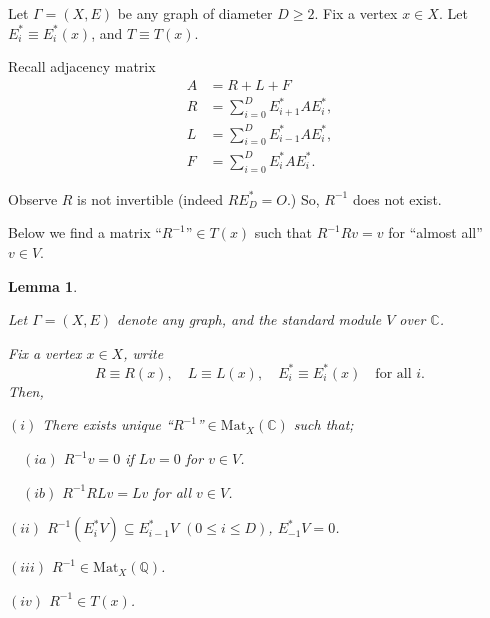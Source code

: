 \documentclass[
]{book}
\newtheorem{lemma}{Lemma}[chapter]
\theoremstyle{definition}
\theoremstyle{definition}
\theoremstyle{definition}
\theoremstyle{definition}
\theoremstyle{remark}
\begin{document}
Let \(\Gamma = (X, E)\) be any graph of diameter \(D\geq 2\). Fix a vertex \(x\in X\). Let \(E^*_i\equiv E^*_i(x)\), and \(T \equiv T(x)\).

Recall adjacency matrix
\begin{align}
A & = R + L + F\\
R & = \sum_{i=0}^D E^*_{i+1}AE^*_i,\\
L & = \sum_{i=0}^D E^*_{i-1}AE^*_i,\\
F & = \sum_{i=0}^D E^*_{i}AE^*_i.
\end{align}

Observe \(R\) is not invertible (indeed \(RE^*_D = O\).)
So, \(R^{-1}\) does not exist.

Below we find a matrix ``\(R^{-1}\)''\(\in T(x)\) such that \(R^{-1}Rv = v\) for ``almost all'' \(v\in V\).

\begin{lemma}
\protect\hypertarget{lem:inverse-of-r}{}\label{lem:inverse-of-r}

Let \(\Gamma = (X, E)\) denote any graph, and the standard module \(V\) over \(\mathbb{C}\).

Fix a vertex \(x\in X\), write
\[R\equiv R(x), \quad L \equiv L(x), \quad E^*_i\equiv E^*_i(x) \quad \text{for all }i.\]
Then,

\((i)\) There exists unique ``\(R^{-1}\)''\(\in \mathrm{Mat}_X(\mathbb{C})\) such that;

\(\quad (ia)\) \(R^{-1}v = 0\) if \(Lv = 0\) for \(v\in V\).

\(\quad (ib)\) \(R^{-1}RLv = Lv\) for all \(v\in V\).

\((ii)\) \(R^{-1}(E^*_iV)\subseteq E^*_{i-1}V\) \((0\leq i\leq D)\), \(E^*_{-1}V = 0\).

\((iii)\) \(R^{-1}\in \mathrm{Mat}_X(\mathbb{Q})\).

\((iv)\) \(R^{-1}\in T(x)\).

\end{lemma}
\end{document}

